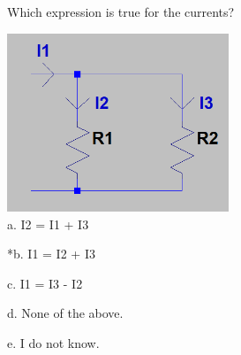 
Which expression is true for the currents?

\includegraphics[width=2.61062in,height=2.09896in]{../../Images/KirchhoffsLawsQ2.png}\\

a. I2 = I1 + I3

*b. I1 = I2 + I3

c. I1 = I3 - I2

d. None of the above.

e. I do not know.\\
